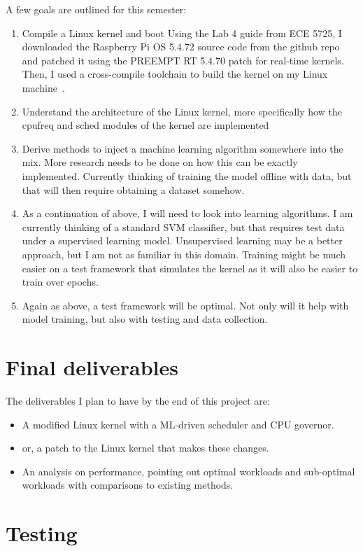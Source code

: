 \documentclass[12pt]{article}
\begin{document}
A few goals are outlined for this semester:
\begin{enumerate}
    \item Compile a Linux kernel and boot
    \subitem Using the Lab 4 guide from ECE 5725, I downloaded the Raspberry Pi OS 5.4.72 source code from the github repo and patched it using the PREEMPT RT 5.4.70 patch for real-time kernels. Then, I used a cross-compile toolchain to build the kernel on my Linux machine~\cite{KernelBuildingRaspberry}. 
    \item Understand the architecture of the Linux kernel, more specifically how the cpufreq and sched modules of the kernel are implemented
    \item Derive methods to inject a machine learning algorithm somewhere into the mix. More research needs to be done on how this can be exactly implemented. Currently thinking of training the model offline with data, but that will then require obtaining a dataset somehow.
    \item As a continuation of above, I will need to look into learning algorithms. I am currently thinking of a standard SVM classifier, but that requires test data under a supervised learning model. Unsupervised learning may be a better approach, but I am not as familiar in this domain. Training might be much easier on a test framework that simulates the kernel as it will also be easier to train over epochs.
    \item Again as above, a test framework will be optimal. Not only will it help with model training, but also with testing and data collection.
\end{enumerate}
\section*{Final deliverables}
The deliverables I plan to have by the end of this project are:

\begin{itemize}
    \item A modified Linux kernel with a ML-driven scheduler and CPU governor.
    \item or, a patch to the Linux kernel that makes these changes.
    \item An analysis on performance, pointing out optimal workloads and sub-optimal workloads with comparisons to existing methods.
\end{itemize}

\section*{Testing}
\end{document}

